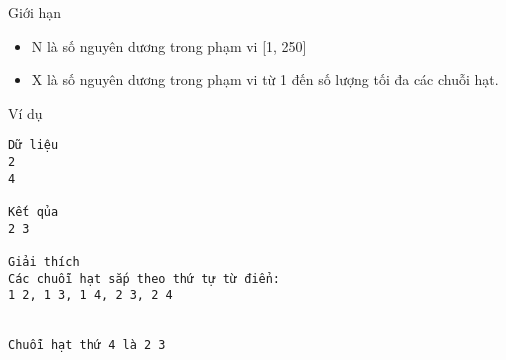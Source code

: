 Giới hạn
\begin{itemize}
	\item     N là số nguyên dương trong phạm vi [1, 250]   
	\item     X là số nguyên dương trong phạm vi từ 1 đến số lượng tối đa các chuỗi hạt.   
\end{itemize}
Ví dụ
\begin{verbatim}
Dữ liệu
2
4

Kết qủa
2 3

Giải thích
Các chuỗi hạt sắp theo thứ tự từ điển:
1 2, 1 3, 1 4, 2 3, 2 4


Chuỗi hạt thứ 4 là 2 3

\end{verbatim}